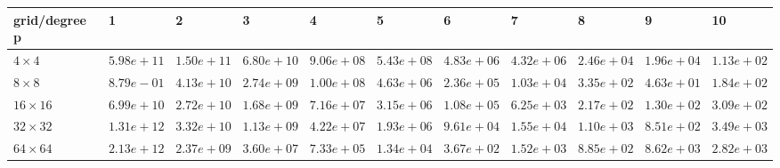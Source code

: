 \begin{tabular}{lllllllllll}
\hline
 grid/degree p   & 1          & 2          & 3          & 4          & 5          & 6          & 7          & 8          & 9          & 10         \\
\hline
 $4 \times 4$    & $5.98e+11$ & $1.50e+11$ & $6.80e+10$ & $9.06e+08$ & $5.43e+08$ & $4.83e+06$ & $4.32e+06$ & $2.46e+04$ & $1.96e+04$ & $1.13e+02$ \\
 $8 \times 8$    & $8.79e-01$ & $4.13e+10$ & $2.74e+09$ & $1.00e+08$ & $4.63e+06$ & $2.36e+05$ & $1.03e+04$ & $3.35e+02$ & $4.63e+01$ & $1.84e+02$ \\
 $16 \times 16$  & $6.99e+10$ & $2.72e+10$ & $1.68e+09$ & $7.16e+07$ & $3.15e+06$ & $1.08e+05$ & $6.25e+03$ & $2.17e+02$ & $1.30e+02$ & $3.09e+02$ \\
 $32 \times 32$  & $1.31e+12$ & $3.32e+10$ & $1.13e+09$ & $4.22e+07$ & $1.93e+06$ & $9.61e+04$ & $1.55e+04$ & $1.10e+03$ & $8.51e+02$ & $3.49e+03$ \\
 $64 \times 64$  & $2.13e+12$ & $2.37e+09$ & $3.60e+07$ & $7.33e+05$ & $1.34e+04$ & $3.67e+02$ & $1.52e+03$ & $8.85e+02$ & $8.62e+03$ & $2.82e+03$ \\
\hline
\end{tabular}